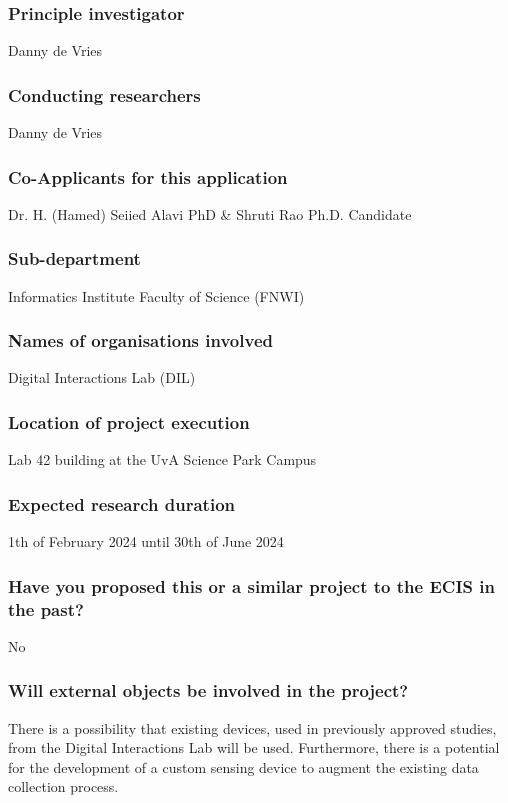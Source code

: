 \documentclass[a4paper]{article}
\begin{document}
\subsubsection{Principle investigator}

Danny de Vries

\subsubsection{Conducting researchers}

Danny de Vries

\subsubsection{Co-Applicants for this application}

Dr. H. (Hamed) Seiied Alavi PhD \& Shruti Rao Ph.D. Candidate

\subsubsection{Sub-department}

Informatics Institute Faculty of Science (FNWI)

\subsubsection{Names of organisations involved}

Digital Interactions Lab (DIL)

\subsubsection{Location of project execution}

Lab 42 building at the UvA Science Park Campus

\subsubsection{Expected research duration}

1th of February 2024 until 30th of June 2024

\subsubsection{Have you proposed this or a similar project to the ECIS in the past?}
No

\subsubsection{Will external objects be involved in the project?}
There is a possibility that existing devices, used in previously approved studies, from the Digital Interactions Lab will be used. Furthermore, there is a potential for the development of a custom sensing device to augment the existing data collection process.
\end{document}
